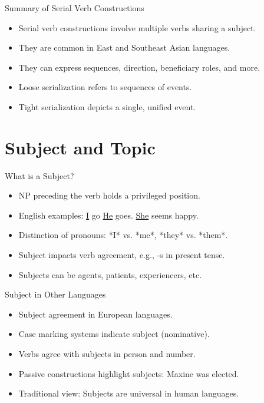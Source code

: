 \documentclass{beamer}
\newcommand{\ul}[1]{\uline{#1}}
\begin{document}
\begin{frame}{Summary of Serial Verb Constructions}
\begin{itemize}
    \item Serial verb constructions involve multiple verbs sharing a subject.
    \item They are common in East and Southeast Asian languages.
    \item They can express sequences, direction, beneficiary roles, and more.
    \item Loose serialization refers to sequences of events.
    \item Tight serialization depicts a single, unified event.
\end{itemize}
\end{frame}

\section{Subject and Topic}

\begin{frame}{What is a Subject?}
  \begin{itemize}
    \item NP preceding the verb holds a privileged position.
    \item English examples:
\ex
\ul{I} go
\xe
\ex
\ul{He} goes.
\xe
\ex
\ul{She} seems happy.
\xe
    \item Distinction of pronouns: *I* vs. *me*, *they* vs. *them*.
    \item Subject impacts verb agreement, e.g., -s in present tense.
    \item Subjects can be agents, patients, experiencers, etc.
  \end{itemize}
\end{frame}

\begin{frame}{Subject in Other Languages}
  \begin{itemize}
    \item Subject agreement in European languages.
    \item Case marking systems indicate subject (nominative).
    \item Verbs agree with subjects in person and number.
    \item Passive constructions highlight subjects:
    \ex
      Maxine was elected.
    \xe
    \item Traditional view: Subjects are universal in human languages.
  \end{itemize}
\end{frame}
\end{document}
